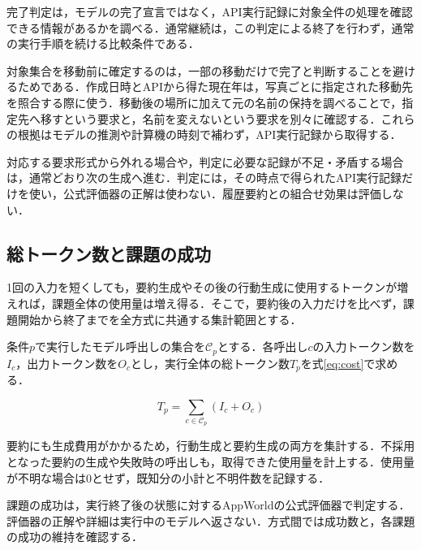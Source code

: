 \documentclass[letter]{ieicej}
\begin{document}
完了判定は，モデルの完了宣言ではなく，API実行記録に対象全件の処理を確認できる情報があるかを調べる．通常継続は，この判定による終了を行わず，通常の実行手順を続ける比較条件である．

対象集合を移動前に確定するのは，一部の移動だけで完了と判断することを避けるためである．作成日時とAPIから得た現在年は，写真ごとに指定された移動先を照合する際に使う．移動後の場所に加えて元の名前の保持を調べることで，指定先へ移すという要求と，名前を変えないという要求を別々に確認する．これらの根拠はモデルの推測や計算機の時刻で補わず，API実行記録から取得する．

対応する要求形式から外れる場合や，判定に必要な記録が不足・矛盾する場合は，通常どおり次の生成へ進む．判定には，その時点で得られたAPI実行記録だけを使い，公式評価器の正解は使わない．履歴要約との組合せ効果は評価しない．

\subsection{総トークン数と課題の成功}

1回の入力を短くしても，要約生成やその後の行動生成に使用するトークンが増えれば，課題全体の使用量は増え得る．そこで，要約後の入力だけを比べず，課題開始から終了までを全方式に共通する集計範囲とする．

\par\noindent\begin{minipage}{\columnwidth}
\setlength{\abovedisplayskip}{4pt}\setlength{\belowdisplayskip}{4pt}
条件$p$で実行したモデル呼出しの集合を$\mathcal C_p$とする．各呼出し$c$の入力トークン数を$I_c$，出力トークン数を$O_c$とし，実行全体の総トークン数$T_p$を\mbox{式\eqref{eq:cost}で求める．}

\begin{equation}
 T_p=\sum_{c\in\mathcal C_p}(I_c+O_c)
 \label{eq:cost}
\end{equation}

要約にも生成費用がかかるため，行動生成と要約生成の両方を集計する．不採用となった要約の生成や失敗時の呼出しも，取得できた使用量を計上する．使用量が不明な場合は0とせず，既知分の小計と不明件数を記録する．

\end{minipage}\par{}

課題の成功は，実行終了後の状態に対するAppWorld\cite{trivedi2024appworld}の公式評価器で判定する．評価器の正解や詳細は実行中のモデルへ返さない．方式間では成功数と，各課題の成功の維持を確認する．
\end{document}
